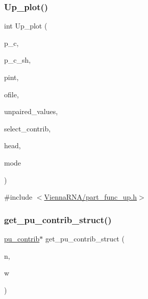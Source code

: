 \subsubsection{\texorpdfstring{Up\+\_\+plot()}{Up\_plot()}}
{\footnotesize\ttfamily int Up\+\_\+plot (\begin{DoxyParamCaption}\item[{\mbox{\hyperlink{group__data__structures_structpu__contrib}{pu\+\_\+contrib}} $\ast$}]{p\+\_\+c,  }\item[{\mbox{\hyperlink{group__data__structures_structpu__contrib}{pu\+\_\+contrib}} $\ast$}]{p\+\_\+c\+\_\+sh,  }\item[{\mbox{\hyperlink{group__data__structures_structinteract}{interact}} $\ast$}]{pint,  }\item[{char $\ast$}]{ofile,  }\item[{int $\ast$$\ast$}]{unpaired\+\_\+values,  }\item[{char $\ast$}]{select\+\_\+contrib,  }\item[{char $\ast$}]{head,  }\item[{unsigned int}]{mode }\end{DoxyParamCaption})}



{\ttfamily \#include $<$\mbox{\hyperlink{part__func__up_8h}{Vienna\+R\+N\+A/part\+\_\+func\+\_\+up.\+h}}$>$}

\mbox{\label{group__up__cofold_gadb5cde7e5ef562664db38638171c7a66}} 
\subsubsection{\texorpdfstring{get\+\_\+pu\+\_\+contrib\+\_\+struct()}{get\_pu\_contrib\_struct()}}
{\footnotesize\ttfamily \mbox{\hyperlink{group__data__structures_structpu__contrib}{pu\+\_\+contrib}}$\ast$ get\+\_\+pu\+\_\+contrib\+\_\+struct (\begin{DoxyParamCaption}\item[{unsigned int}]{n,  }\item[{unsigned int}]{w }\end{DoxyParamCaption})}




